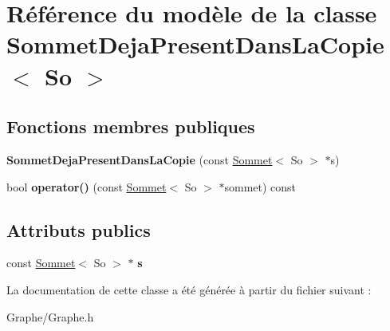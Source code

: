 \hypertarget{class_sommet_deja_present_dans_la_copie}{}\section{Référence du modèle de la classe Sommet\+Deja\+Present\+Dans\+La\+Copie$<$ So $>$}
\label{class_sommet_deja_present_dans_la_copie}
\subsection*{Fonctions membres publiques}
\begin{DoxyCompactItemize}
\item 
\mbox{\label{class_sommet_deja_present_dans_la_copie_a47b7c4847f43bc70d9191a3fda2f85f1}} 
{\bfseries Sommet\+Deja\+Present\+Dans\+La\+Copie} (const \mbox{\hyperlink{class_sommet}{Sommet}}$<$ So $>$ $\ast$s)
\item 
\mbox{\label{class_sommet_deja_present_dans_la_copie_a77f31f3f087bdc6351b303d59ffd7acd}} 
bool {\bfseries operator()} (const \mbox{\hyperlink{class_sommet}{Sommet}}$<$ So $>$ $\ast$sommet) const
\end{DoxyCompactItemize}
\subsection*{Attributs publics}
\begin{DoxyCompactItemize}
\item 
\mbox{\label{class_sommet_deja_present_dans_la_copie_a41f6b10462d131dc520afc975c87534d}} 
const \mbox{\hyperlink{class_sommet}{Sommet}}$<$ So $>$ $\ast$ {\bfseries s}
\end{DoxyCompactItemize}


La documentation de cette classe a été générée à partir du fichier suivant \+:\begin{DoxyCompactItemize}
\item 
Graphe/Graphe.\+h\end{DoxyCompactItemize}
